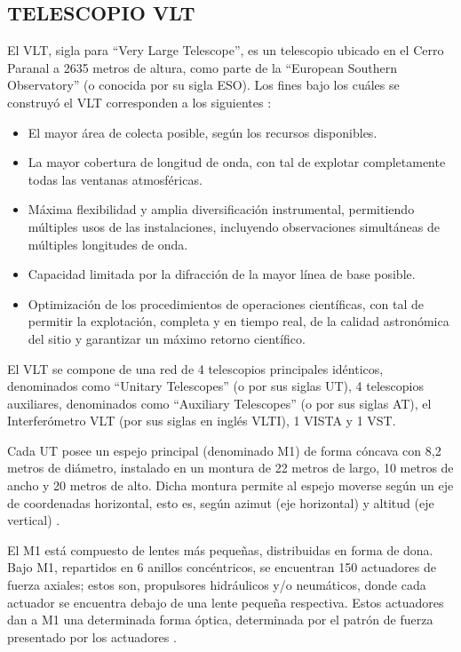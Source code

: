 
\subsection{TELESCOPIO VLT}
El VLT, sigla para “Very Large Telescope”, es un telescopio ubicado en el Cerro Paranal a 2635 metros de altura, como parte de la “European Southern Observatory” (o conocida por su sigla ESO). 
Los fines bajo los cuáles se construyó el VLT corresponden a los siguientes \cite{eso1998vlt}:
\begin{itemize}

    \item El mayor área de colecta posible, según los recursos disponibles.
    \item La mayor cobertura de longitud de onda, con tal de explotar completamente todas las ventanas atmosféricas.
    \item Máxima flexibilidad y amplia diversificación instrumental, permitiendo múltiples usos de las instalaciones, incluyendo observaciones simultáneas de múltiples longitudes de onda.
    \item Capacidad limitada por la difracción de la mayor línea de base posible.
    \item Optimización de los procedimientos de operaciones científicas, con tal de permitir la explotación, completa y en tiempo real, de la calidad astronómica del sitio y garantizar un máximo retorno científico.

\end{itemize}

El VLT se compone de una red de 4 telescopios principales idénticos, denominados como “Unitary Telescopes” (o por sus siglas UT), 4 telescopios auxiliares, denominados como “Auxiliary Telescopes” (o por sus siglas AT), el  Interferómetro VLT (por sus siglas en inglés VLTI), 1 VISTA y 1 VST.

Cada UT posee un espejo principal (denominado M1) de forma cóncava con 8,2 metros de diámetro, instalado en un montura de 22 metros de largo, 10 metros de ancho y 20 metros de alto. Dicha montura permite al espejo moverse según un eje de coordenadas horizontal, esto es, según azimut (eje horizontal) y altitud (eje vertical) \cite{eso1998vlt}.

El M1 está compuesto de lentes más pequeñas, distribuidas en forma de dona. Bajo M1, repartidos en 6 anillos concéntricos, se encuentran 150 actuadores de fuerza axiales; estos son, propulsores hidráulicos y/o neumáticos, donde cada actuador se encuentra debajo de una lente pequeña respectiva. Estos actuadores dan a M1 una determinada forma óptica, determinada por el patrón de fuerza presentado por los actuadores \cite{eso1998vlt}.

